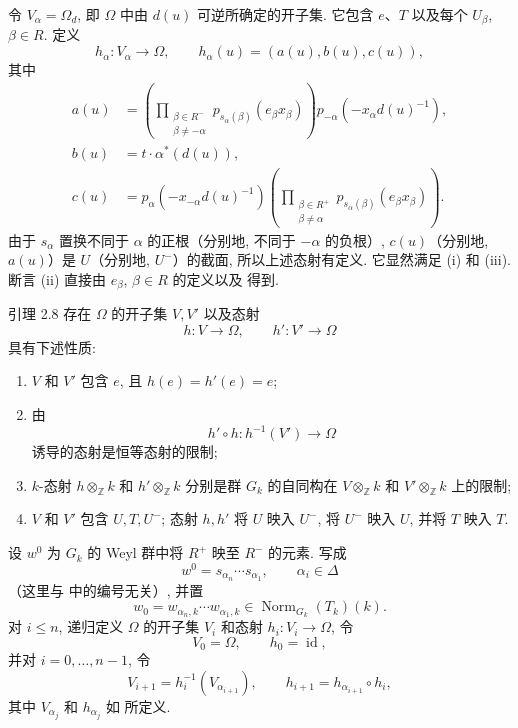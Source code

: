 令 \(V_\alpha=\Omega_d\), 即 \(\Omega\) 中由 \(d(u)\) 可逆所确定的开子集. 它包含 \(e\)、\(T\) 以及每个 \(U_\beta\), \(\beta\in R\). 定义
\[
 h_\alpha\colon V_\alpha\longrightarrow\Omega,\qquad
 h_\alpha(u)=(a(u),b(u),c(u)),
\]
其中
\begin{align*}
a(u)
 &=
\left(\prod_{\substack{\beta\in R^-\\\beta\ne-\alpha}}
 p_{s_\alpha(\beta)}(e_\beta x_\beta)\right)
p_{-\alpha}\!\left(-x_\alpha d(u)^{-1}\right),\\
b(u)&=t\cdot\alpha^\ast(d(u)),\\
c(u)
 &=p_\alpha\!\left(-x_{-\alpha}d(u)^{-1}\right)
\left(\prod_{\substack{\beta\in R^+\\\beta\ne\alpha}}
 p_{s_\alpha(\beta)}(e_\beta x_\beta)\right).
\end{align*}
由于 \(s_\alpha\) 置换不同于 \(\alpha\) 的正根（分别地, 不同于 \(-\alpha\) 的负根）, \(c(u)\)（分别地, \(a(u)\)）是 \(U\)（分别地, \(U^-\)）的截面, 所以上述态射有定义. 它显然满足 (i) 和 (iii). 断言 (ii) 直接由 \(e_\beta\), \(\beta\in R\) 的定义以及 得到.

\begin{sgastatement}{引理 2.8}
存在 \(\Omega\) 的开子集 \(V,V'\) 以及态射
\[
 h\colon V\longrightarrow\Omega,\qquad
 h'\colon V'\longrightarrow\Omega
\]
具有下述性质:
\begin{enumerate}[label=\textup{(\roman*)},leftmargin=2.2em]
\item \(V\) 和 \(V'\) 包含 \(e\), 且 \(h(e)=h'(e)=e\);
\item{} 由
\[
 h'\circ h\colon h^{-1}(V')\longrightarrow\Omega
\]
诱导的态射是恒等态射的限制;
\item{} \(k\)-态射 \(h\otimes_{\mathbb Z}k\) 和 \(h'\otimes_{\mathbb Z}k\) 分别是群 \(G_k\) 的自同构在 \(V\otimes_{\mathbb Z}k\) 和 \(V'\otimes_{\mathbb Z}k\) 上的限制;
\item{} \(V\) 和 \(V'\) 包含 \(U,T,U^-\); 态射 \(h,h'\) 将 \(U\) 映入 \(U^-\), 将 \(U^-\) 映入 \(U\), 并将 \(T\) 映入 \(T\).
\end{enumerate}
\end{sgastatement}

设 \(w^0\) 为 \(G_k\) 的 Weyl 群中将 \(R^+\) 映至 \(R^-\) 的元素. 写成
\[
 w^0=s_{\alpha_n}\cdots s_{\alpha_1},\qquad \alpha_i\in\Delta
\]
（这里与 中的编号无关）, 并置
\[
 w_0=w_{\alpha_n,k}\cdots w_{\alpha_1,k}
 \in\operatorname{Norm}_{G_k}(T_k)(k).
\]
对 \(i\leq n\), 递归定义 \(\Omega\) 的开子集 \(V_i\) 和态射 \(h_i\colon V_i\to\Omega\), 令
\[
 V_0=\Omega,\qquad h_0=\operatorname{id},
\]
并对 \(i=0,\ldots,n-1\), 令
\[
 V_{i+1}=h_i^{-1}(V_{\alpha_{i+1}}),\qquad
 h_{i+1}=h_{\alpha_{i+1}}\circ h_i,
\]
其中 \(V_{\alpha_j}\) 和 \(h_{\alpha_j}\) 如 所定义.

